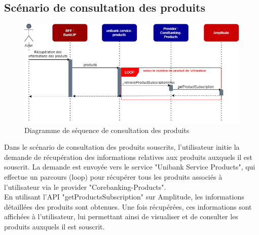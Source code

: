 \subsection{Scénario de consultation des produits}
\begin{figure}[!h]
    \centering %
        \includegraphics[width=14cm]{images/conception/sequence_products.png}
    \caption{Diagramme de séquence de consultation des produits}
\end{figure}
Dans le scénario de consultation des produits souscrits, l'utilisateur initie la demande de récupération des informations relatives aux produits auxquels il est souscrit. La demande est envoyée vers le service "Unibank Service Products", qui effectue un parcours (loop) pour récupérer tous les produits associés à l'utilisateur via le provider "Corebanking-Products".\\
En utilisant l'API "getProductsSubscription" sur Amplitude, les informations détaillées des produits sont obtenues. Une fois récupérées, ces informations sont affichées à l'utilisateur, lui permettant ainsi de visualiser et de consulter les produits auxquels il est souscrit.
\newpage

